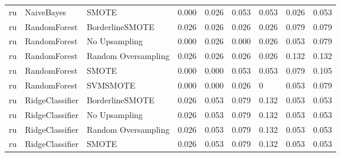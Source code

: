 \begin{tabular}{lllllllll}
      ru &                      NaiveBayes &                         SMOTE &     0.000 &                     0.026 &                 0.053 &                  0.053 &                                   0.026 &     0.053 \\
      ru &                    RandomForest &               BorderlineSMOTE &     0.026 &                     0.026 &                 0.026 &                  0.026 &                                   0.079 &     0.079 \\
      ru &                    RandomForest &                 No Upsampling &     0.000 &                     0.026 &                 0.000 &                  0.026 &                                   0.053 &     0.079 \\
      ru &                    RandomForest &           Random Oversampling &     0.026 &                     0.026 &                 0.026 &                  0.026 &                                   0.132 &     0.132 \\
      ru &                    RandomForest &                         SMOTE &     0.000 &                     0.000 &                 0.053 &                  0.053 &                                   0.079 &     0.105 \\
      ru &                    RandomForest &                      SVMSMOTE &     0.000 &                     0.000 &                 0.026 &                      0 &                                   0.053 &     0.079 \\
      ru &                 RidgeClassifier &               BorderlineSMOTE &     0.026 &                     0.053 &                 0.079 &                  0.132 &                                   0.053 &     0.053 \\
      ru &                 RidgeClassifier &                 No Upsampling &     0.026 &                     0.053 &                 0.079 &                  0.132 &                                   0.053 &     0.053 \\
      ru &                 RidgeClassifier &           Random Oversampling &     0.026 &                     0.053 &                 0.079 &                  0.132 &                                   0.053 &     0.053 \\
      ru &                 RidgeClassifier &                         SMOTE &     0.026 &                     0.053 &                 0.079 &                  0.132 &                                   0.053 &     0.053 \\

\end{tabular}
